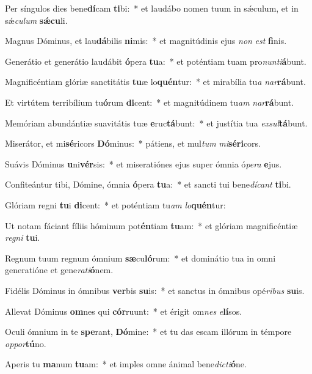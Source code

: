 \item Per síngulos dies bene\textbf{dí}cam \textbf{ti}bi:~* et laudábo nomen tuum in sǽculum, et in sǽ\textit{cu}\textit{lum} \textbf{sǽ}\textbf{cu}li.
\item Magnus Dóminus, et lau\textbf{dá}bilis \textbf{ni}mis:~* et magnitúdinis ejus \textit{non} \textit{est} \textbf{fi}nis.
\item Generátio et generátio laudábit \textbf{ó}pera \textbf{tu}a:~* et poténtiam tuam pro\textit{nun}\textit{ti}\textbf{á}bunt.
\item Magnificéntiam glóriæ sanctitátis \textbf{tu}æ lo\textbf{quén}tur:~* et mirabília tu\textit{a} \textit{nar}\textbf{rá}bunt.
\item Et virtútem terribílium tu\textbf{ó}rum \textbf{di}cent:~* et magnitúdinem tu\textit{am} \textit{nar}\textbf{rá}bunt.
\item Memóriam abundántiæ suavitátis tuæ \textbf{e}ruc\textbf{tá}bunt:~* et justítia tua \textit{ex}\textit{sul}\textbf{tá}bunt.
\item Miserátor, et mi\textbf{sé}ricors \textbf{Dó}minus:~* pátiens, et mul\textit{tum} \textit{mi}\textbf{sé}\textbf{ri}cors.
\item Suávis Dóminus \textbf{u}ni\textbf{vér}sis:~* et miseratiónes ejus super ómnia ó\textit{pe}\textit{ra} \textbf{e}jus.
\item Confiteántur tibi, Dómine, ómnia \textbf{ó}pera \textbf{tu}a:~* et sancti tui bene\textit{dí}\textit{cant} \textbf{ti}bi.
\item Glóriam regni \textbf{tu}i \textbf{di}cent:~* et poténtiam tu\textit{am} \textit{lo}\textbf{quén}tur:
\item Ut notam fáciant fíliis hóminum pot\textbf{én}tiam \textbf{tu}am:~* et glóriam magnificéntiæ \textit{re}\textit{gni} \textbf{tu}i.
\item Regnum tuum regnum ómnium \textbf{sæ}cu\textbf{ló}rum:~* et dominátio tua in omni generatióne et gene\textit{ra}\textit{ti}\textbf{ó}nem.
\item Fidélis Dóminus in ómnibus \textbf{ver}bis \textbf{su}is:~* et sanctus in ómnibus opé\textit{ri}\textit{bus} \textbf{su}is.
\item Allevat Dóminus \textbf{om}nes qui \textbf{cór}ruunt:~* et érigit om\textit{nes} \textit{e}\textbf{lí}sos.
\item Oculi ómnium in te \textbf{spe}rant, \textbf{Dó}mine:~* et tu das escam illórum in témpore \textit{op}\textit{por}\textbf{tú}no.
\item Aperis tu \textbf{ma}num \textbf{tu}am:~* et imples omne ánimal bene\textit{dic}\textit{ti}\textbf{ó}ne.
